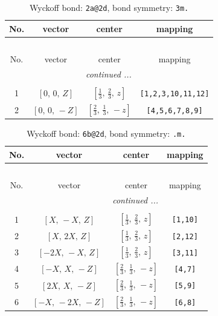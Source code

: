 \documentclass[fleqn,8pt]{jsarticle}
\begin{document}
\begin{longtable}{cccc}
\caption{Wyckoff bond: {\tt 2a@2d}, bond symmetry: {\tt 3m.}}
 \\
 \hline \hline
No. & vector & center & mapping \\ \hline \endfirsthead

\multicolumn{3}{l}{\tablename\ \thetable{}} \\
 \hline \hline
No. & vector & center & mapping \\ \hline \endhead

 \hline \hline
\multicolumn{3}{r}{\footnotesize\it continued ...} \\ \endfoot

 \hline \hline
\multicolumn{3}{r}{} \\ \endlastfoot

1 & $\left[ 0,\, 0,\, Z \right]$ & $\left[ \frac{1}{3},\, \frac{2}{3},\, z \right]$ & {\tt [1,2,3,10,11,12]} \\ \hline
2 & $\left[ 0,\, 0,\, - Z \right]$ & $\left[ \frac{2}{3},\, \frac{1}{3},\, - z \right]$ & {\tt [4,5,6,7,8,9]} \\
\end{longtable}
\renewcommand{\arraystretch}{1.2}
\begin{longtable}{cccc}
\caption{Wyckoff bond: {\tt 6b@2d}, bond symmetry: {\tt .m.}}
 \\
 \hline \hline
No. & vector & center & mapping \\ \hline \endfirsthead

\multicolumn{3}{l}{\tablename\ \thetable{}} \\
 \hline \hline
No. & vector & center & mapping \\ \hline \endhead

 \hline \hline
\multicolumn{3}{r}{\footnotesize\it continued ...} \\ \endfoot

 \hline \hline
\multicolumn{3}{r}{} \\ \endlastfoot

1 & $\left[ X,\, - X,\, Z \right]$ & $\left[ \frac{1}{3},\, \frac{2}{3},\, z \right]$ & {\tt [1,10]} \\ \hline
2 & $\left[ X,\, 2 X,\, Z \right]$ & $\left[ \frac{1}{3},\, \frac{2}{3},\, z \right]$ & {\tt [2,12]} \\ \hline
3 & $\left[ - 2 X,\, - X,\, Z \right]$ & $\left[ \frac{1}{3},\, \frac{2}{3},\, z \right]$ & {\tt [3,11]} \\ \hline
4 & $\left[ - X,\, X,\, - Z \right]$ & $\left[ \frac{2}{3},\, \frac{1}{3},\, - z \right]$ & {\tt [4,7]} \\ \hline
5 & $\left[ 2 X,\, X,\, - Z \right]$ & $\left[ \frac{2}{3},\, \frac{1}{3},\, - z \right]$ & {\tt [5,9]} \\ \hline
6 & $\left[ - X,\, - 2 X,\, - Z \right]$ & $\left[ \frac{2}{3},\, \frac{1}{3},\, - z \right]$ & {\tt [6,8]} \\
\end{longtable}
\end{document}
